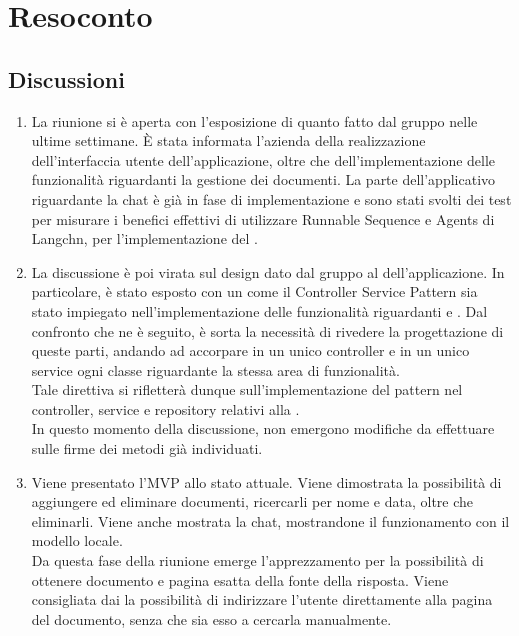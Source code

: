 \section{Resoconto} \label{sec:resoconto}
\subsection{Discussioni} \label{subsec:resdiscussione}
\begin{enumerate}
    \item La riunione si è aperta con l'esposizione di quanto fatto dal gruppo nelle ultime settimane. È stata informata l'azienda della realizzazione dell'interfaccia utente dell'applicazione, oltre che dell'implementazione delle funzionalità riguardanti la gestione dei documenti. La parte dell'applicativo riguardante la chat è già in fase di implementazione e sono stati svolti dei test per misurare i benefici effettivi di utilizzare Runnable Sequence e Agents di Langchn, per l'implementazione del .
    \item La discussione è poi virata sul design dato dal gruppo al  dell'applicazione. In particolare, è stato esposto con un  come il Controller Service  Pattern sia stato impiegato nell'implementazione delle funzionalità riguardanti  e . Dal confronto che ne è seguito, è sorta la necessità di rivedere la progettazione di queste parti, andando ad accorpare in un unico controller e in un unico service ogni classe riguardante la stessa area di funzionalità.\\
    Tale direttiva si rifletterà dunque sull'implementazione del pattern nel controller, service e repository relativi alla .\\
    In questo momento della discussione, non emergono modifiche da effettuare sulle firme dei metodi già individuati.
    \item Viene presentato l'MVP allo stato attuale. Viene dimostrata la possibilità di aggiungere ed eliminare documenti, ricercarli per nome e data, oltre che eliminarli. Viene anche mostrata la chat, mostrandone il funzionamento con il modello locale.\\
    Da questa fase della riunione emerge l'apprezzamento per la possibilità di ottenere documento e pagina esatta della fonte della risposta. Viene consigliata dai  la possibilità di indirizzare l'utente direttamente alla pagina del documento, senza che sia esso a cercarla manualmente.\\

\end{enumerate}
